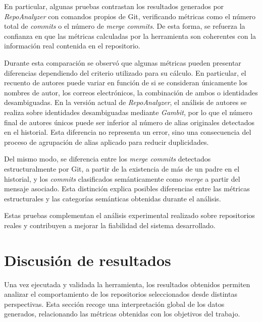 \documentclass[a4paper, 12pt]{book}
\begin{document}
En particular, algunas pruebas contrastan los resultados generados por \emph{RepoAnalyzer} con comandos propios de Git, verificando métricas como el número total de \emph{commits} o el número de \emph{merge commits}. De esta forma, se refuerza la confianza en que las métricas calculadas por la herramienta son coherentes con la información real contenida en el repositorio.

Durante esta comparación se observó que algunas métricas pueden presentar diferencias dependiendo del criterio utilizado para su cálculo. En particular, el recuento de autores puede variar en función de si se consideran únicamente los nombres de autor, los correos electrónicos, la combinación de ambos o identidades desambiguadas. En la versión actual de \emph{RepoAnalyzer}, el análisis de autores se realiza sobre identidades desambiguadas mediante \emph{Gambit}, por lo que el número final de autores únicos puede ser inferior al número de alias originales detectados en el historial. Esta diferencia no representa un error, sino una consecuencia del proceso de agrupación de alias aplicado para reducir duplicidades.

Del mismo modo, se diferencia entre los \emph{merge commits} detectados estructuralmente por Git, a partir de la existencia de más de un padre en el historial, y los \emph{commits} clasificados semánticamente como \emph{merge} a partir del mensaje asociado. Esta distinción explica posibles diferencias entre las métricas estructurales y las categorías semánticas obtenidas durante el análisis.

Estas pruebas complementan el análisis experimental realizado sobre repositorios reales y contribuyen a mejorar la fiabilidad del sistema desarrollado.


\section{Discusión de resultados}
\label{sec:discusion_resultados}

Una vez ejecutada y validada la herramienta, los resultados obtenidos permiten analizar el comportamiento de los repositorios seleccionados desde distintas perspectivas. Esta sección recoge una interpretación global de los datos generados, relacionando las métricas obtenidas con los objetivos del trabajo.
\end{document}
